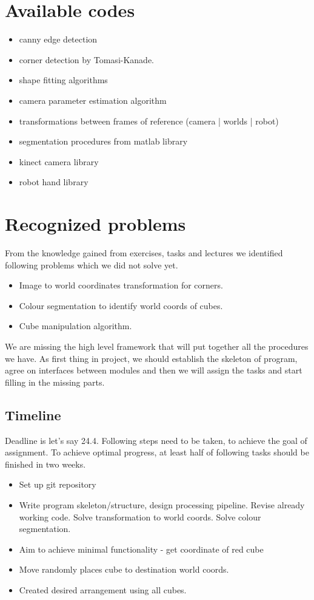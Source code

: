 \documentclass[a4]{report}
\begin{document}
\section{Available codes}

\begin{itemize}
    \item canny edge detection
    \item corner detection by Tomasi-Kanade.
    \item shape fitting algorithms
    \item camera parameter estimation algorithm
    \item transformations between frames of reference (camera | worlds | robot)
    \item segmentation procedures from matlab library
    \item kinect camera library
    \item robot hand library
\end{itemize}


\section{Recognized problems}
From the knowledge gained from exercises, tasks and lectures we identified following problems which we did not solve yet.
\begin{itemize}
    \item Image to world coordinates transformation for corners.
    \item Colour segmentation to identify world coords of cubes.
    \item Cube manipulation algorithm.
\end{itemize}

We are missing the high level framework that will put together all the procedures we have. As first thing in project, we should establish the skeleton of program, agree on interfaces between modules and then we will assign the tasks and start filling in the missing parts.

\subsection*{Timeline}
Deadline is let's say 24.4. Following steps need to be taken, to achieve the goal of assignment. To achieve optimal progress, at least half of following tasks should be finished in two weeks.
\begin{itemize}
    \item Set up git repository
    \item Write program skeleton/structure, design processing pipeline.
    \subitem Revise already working code.
    \subitem Solve transformation to world coords.
    \subitem Solve colour segmentation.
    \item Aim to achieve minimal functionality - get coordinate of red cube
    \item Move randomly places cube to destination world coords.
    \item Created desired arrangement using all cubes.
\end{itemize}
\end{document}
